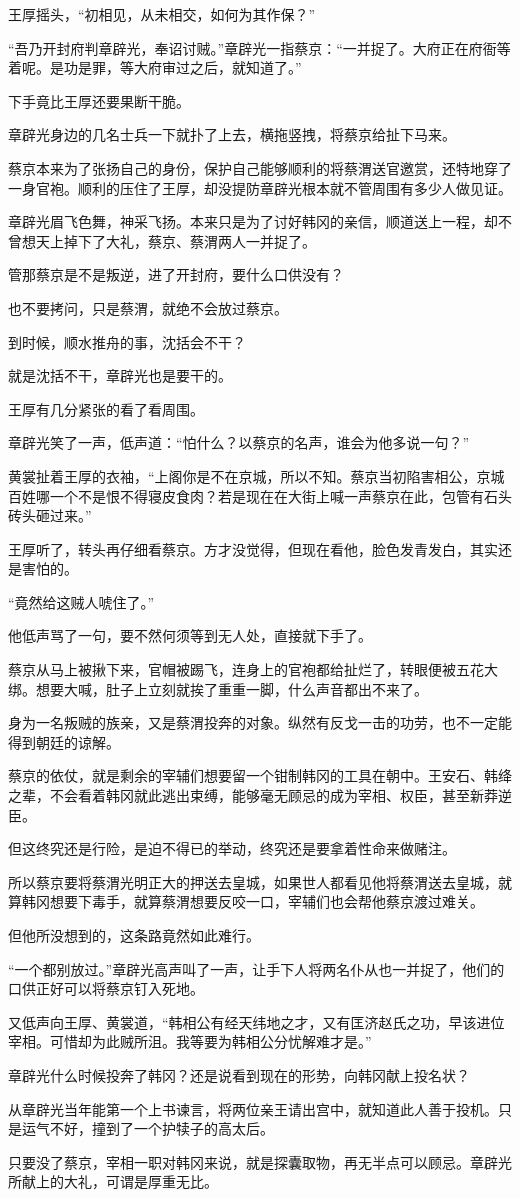 王厚摇头，“初相见，从未相交，如何为其作保？”

“吾乃开封府判章辟光，奉诏讨贼。”章辟光一指蔡京：“一并捉了。大府正在府衙等着呢。是功是罪，等大府审过之后，就知道了。”

下手竟比王厚还要果断干脆。

章辟光身边的几名士兵一下就扑了上去，横拖竖拽，将蔡京给扯下马来。

蔡京本来为了张扬自己的身份，保护自己能够顺利的将蔡渭送官邀赏，还特地穿了一身官袍。顺利的压住了王厚，却没提防章辟光根本就不管周围有多少人做见证。

章辟光眉飞色舞，神采飞扬。本来只是为了讨好韩冈的亲信，顺道送上一程，却不曾想天上掉下了大礼，蔡京、蔡渭两人一并捉了。

管那蔡京是不是叛逆，进了开封府，要什么口供没有？

也不要拷问，只是蔡渭，就绝不会放过蔡京。

到时候，顺水推舟的事，沈括会不干？

就是沈括不干，章辟光也是要干的。

王厚有几分紧张的看了看周围。

章辟光笑了一声，低声道：“怕什么？以蔡京的名声，谁会为他多说一句？”

黄裳扯着王厚的衣袖，“上阁你是不在京城，所以不知。蔡京当初陷害相公，京城百姓哪一个不是恨不得寝皮食肉？若是现在在大街上喊一声蔡京在此，包管有石头砖头砸过来。”

王厚听了，转头再仔细看蔡京。方才没觉得，但现在看他，脸色发青发白，其实还是害怕的。

“竟然给这贼人唬住了。”

他低声骂了一句，要不然何须等到无人处，直接就下手了。

蔡京从马上被揪下来，官帽被踢飞，连身上的官袍都给扯烂了，转眼便被五花大绑。想要大喊，肚子上立刻就挨了重重一脚，什么声音都出不来了。

身为一名叛贼的族亲，又是蔡渭投奔的对象。纵然有反戈一击的功劳，也不一定能得到朝廷的谅解。

蔡京的依仗，就是剩余的宰辅们想要留一个钳制韩冈的工具在朝中。王安石、韩绛之辈，不会看着韩冈就此逃出束缚，能够毫无顾忌的成为宰相、权臣，甚至新莽逆臣。

但这终究还是行险，是迫不得已的举动，终究还是要拿着性命来做赌注。

所以蔡京要将蔡渭光明正大的押送去皇城，如果世人都看见他将蔡渭送去皇城，就算韩冈想要下毒手，就算蔡渭想要反咬一口，宰辅们也会帮他蔡京渡过难关。

但他所没想到的，这条路竟然如此难行。

“一个都别放过。”章辟光高声叫了一声，让手下人将两名仆从也一并捉了，他们的口供正好可以将蔡京钉入死地。

又低声向王厚、黄裳道，“韩相公有经天纬地之才，又有匡济赵氏之功，早该进位宰相。可惜却为此贼所沮。我等要为韩相公分忧解难才是。”

章辟光什么时候投奔了韩冈？还是说看到现在的形势，向韩冈献上投名状？

从章辟光当年能第一个上书谏言，将两位亲王请出宫中，就知道此人善于投机。只是运气不好，撞到了一个护犊子的高太后。

只要没了蔡京，宰相一职对韩冈来说，就是探囊取物，再无半点可以顾忌。章辟光所献上的大礼，可谓是厚重无比。


